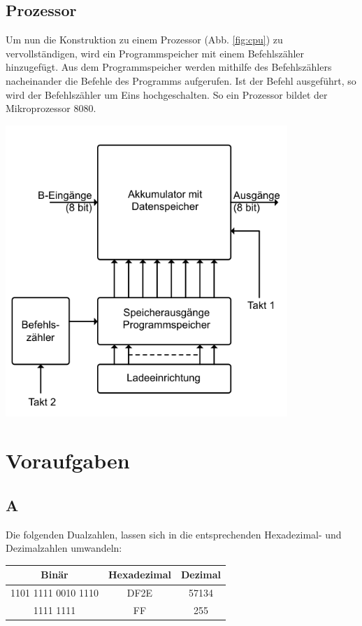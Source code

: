 \documentclass[10pt]{article}
\newenvironment{Figure}
  {\par\medskip\noindent\minipage{\linewidth}}
  {\endminipage\par\medskip}
\begin{document}
\begin{multicols}{2}
  \subsection{Prozessor}
  Um nun die Konstruktion zu einem Prozessor (Abb. \ref{fig:cpu}) zu vervollständigen, wird ein Programmspeicher mit einem Befehlszähler hinzugefügt. Aus dem Programmspeicher werden mithilfe des Befehlszählers nacheinander die Befehle des Programms aufgerufen. Ist der Befehl ausgeführt, so wird der Befehlszähler um Eins hochgeschalten. So ein Prozessor bildet der Mikroprozessor 8080.
  \begin{Figure}
    \centering\includegraphics[width=0.8\textwidth]{cpu.png}
    \label{fig:cpu}
  \end{Figure}
	\section{Voraufgaben}
	\subsection*{A}
	Die folgenden Dualzahlen, lassen sich in die entsprechenden Hexadezimal- und Dezimalzahlen umwandeln:
	\begin{center}
		\begin{tabular}{|c|c|c|}
			\hline
			Binär               & Hexadezimal & Dezimal \\
			\hline
			1101 1111 0010 1110 & DF2E        & 57134   \\
			1111 1111           & FF          & 255     \\
			\hline
		\end{tabular}
	\end{center}

\end{multicols}
\end{document}
